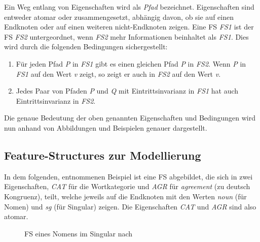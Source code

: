 \documentclass[12pt]{report}
\begin{document}
Ein Weg entlang von Eigenschaften wird als \textit{Pfad} bezeichnet. Eigenschaften sind entweder atomar oder zusammengesetzt, abhängig davon, ob sie auf einen Endknoten oder auf einen weiteren nicht-Endknoten zeigen.
Eine FS \textit{FS1} ist der FS \textit{FS2} untergeordnet, wenn \textit{FS2} mehr Informationen beinhaltet als \textit{FS1}. Dies wird durch die folgenden Bedingungen sichergestellt:

\begin{enumerate}
\item Für jeden Pfad \textit{P} in \textit{FS1} gibt es einen gleichen Pfad \textit{P} in \textit{FS2}. Wenn \textit{P} in \textit{FS1} auf den Wert \textit{v} zeigt, so zeigt er auch in \textit{FS2} auf den Wert \textit{v}.
\item Jedes Paar von Pfaden \textit{P} und \textit{Q} mit Eintrittsinvarianz in \textit{FS1} hat auch Eintrittsinvarianz in \textit{FS2}.
\end{enumerate}

Die genaue Bedeutung der oben genannten Eigenschaften und Bedingungen wird nun anhand von Abbildungen und Beispielen genauer dargestellt. 

\subsection{Feature-Structures zur Modellierung}
In dem folgenden, \cite{cop04} entnommenen Beispiel ist eine FS abgebildet, die sich in zwei Eigenschaften, \textit{\glqq  CAT\grqq{}} für die Wortkategorie und \textit{\glqq  AGR\grqq{}} für \textit{agreement} (zu deutsch \glqq  Kongruenz\grqq{}), teilt, welche jeweils auf die Endknoten mit den Werten \textit{\glqq  noun\grqq{}} (für Nomen) und \textit{\glqq  sg\grqq{}} (für Singular) zeigen. Die Eigenschaften \textit{\glqq  CAT\grqq{}} und \textit{\glqq  AGR\grqq{}} sind also atomar.

\begin{figure}[h!]
\begin{center}
\caption{FS eines Nomens im Singular nach \cite{cop04}}
\end{center}
\end{figure}
\end{document}
